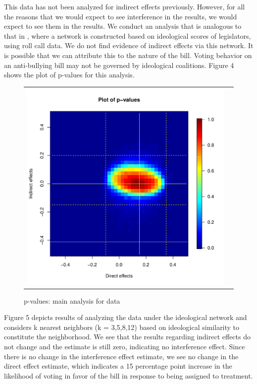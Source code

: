 \documentclass[12pt]{article}
\begin{document}
This data has not been analyzed for indirect effects previously. However, for all the reasons that we would expect to see interference in the \citet{butler2011can} results, we would expect to see them in the \citet{bergan2015call} results. We conduct an analysis that is analogous to that in \citet{coppock2014information}, where a network is constructed based on ideological scores of legislators, using roll call data. We do not find evidence of indirect effects via this network. It is possible that we can attribute this to the nature of the bill.  Voting behavior on an anti-bullying bill may not be governed by ideological coalitions. Figure 4 shows the plot of p-values for this analysis.

\begin{figure}
	\centering
	\begin{tabular}{cc}
	\includegraphics[scale=0.45]{./images/pval_plot_bergan_main.pdf}
	\end{tabular}
	\caption{p-values: main analysis for \citet{bergan2015call} data}
\end{figure}


Figure 5 depicts results of analyzing the \citet{bergan2015call} data under the ideological network and considers k nearest neighbors (k = 3,5,8,12) based on ideological similarity to constitute the neighborhood. We see that the results regarding indirect effects do not change and the estimate is still zero, indicating no interference effect. Since there is no change in the interference effect estimate, we see no change in the direct effect estimate, which indicates a 15 percentage point increase in the likelihood of voting in favor of the bill in response to being assigned to treatment.
\end{document}
